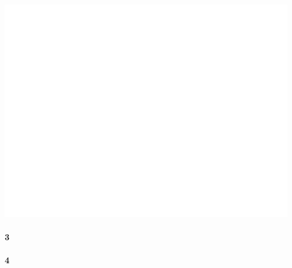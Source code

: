 \documentclass{article}
\begin{document}
\begin{center}
\includegraphics[width=5in]{prob2_result.png}
\end{center}

\paragraph{3}

\paragraph{4}
\end{document}
